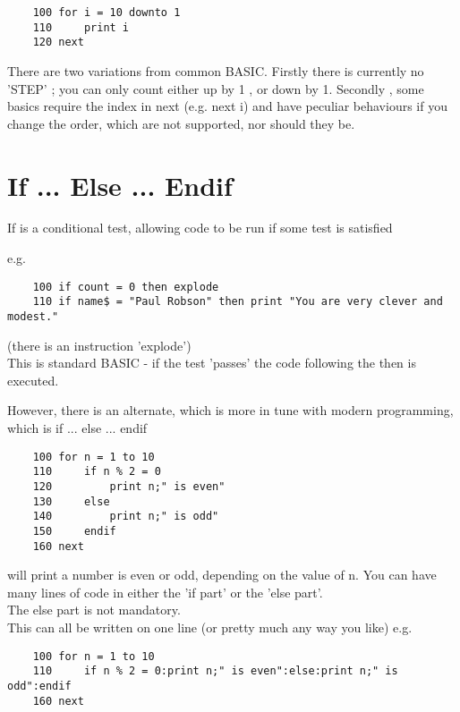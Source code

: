\begin{verbatim}
	100 for i = 10 downto 1
	110 	print i
	120	next
\end{verbatim}

There are two variations from common BASIC. Firstly there is currently no 'STEP' ; you can only count either up by 1 , or down by 1. Secondly , some basics require the index in next (e.g. next i) and have peculiar behaviours if you change the order, which are not supported, nor should they be.

\section{If ... Else ... Endif}

If is a conditional test, allowing code to be run if some test is satisfied

e.g.

\begin{verbatim}
	100 if count = 0 then explode
	110 if name$ = "Paul Robson" then print "You are very clever and modest."
\end{verbatim}

(there is an instruction 'explode')\\

This is standard BASIC - if the test 'passes' the code following the then is executed. 

However, there is an alternate, which is more in tune with modern programming, which is if ... else ... endif

\begin{verbatim}
	100 for n = 1 to 10
	110 	if n % 2 = 0
	120    		print n;" is even"
	130 	else
	140    		print n;" is odd"
	150 	endif
	160 next
\end{verbatim}

will print a number is even or odd, depending on the value of n. You can have many lines of code in either the 'if part' or the 'else part'. \\

The else part is not mandatory.\\

This can all be written on one line (or pretty much any way you like) e.g. \\

\begin{verbatim}
	100 for n = 1 to 10
	110 	if n % 2 = 0:print n;" is even":else:print n;" is odd":endif
	160 next
\end{verbatim}

